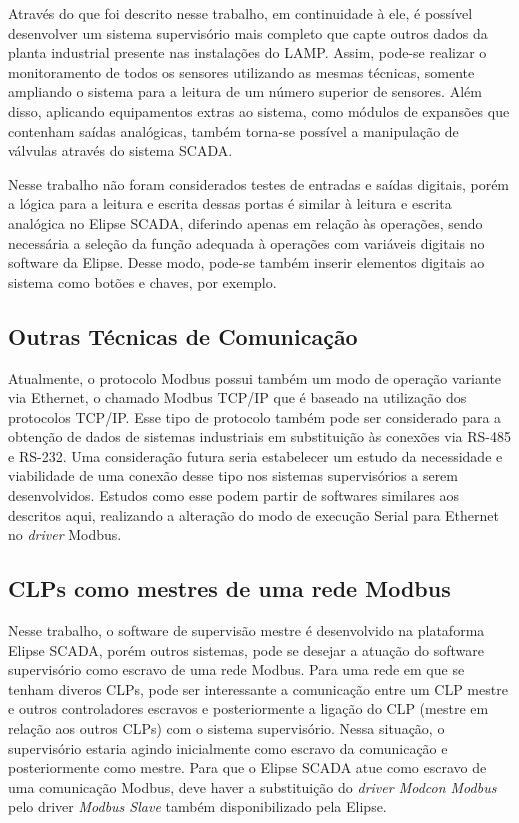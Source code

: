 Através do que foi descrito nesse trabalho, em continuidade à ele, é possível desenvolver um sistema supervisório mais completo que capte outros dados da planta industrial presente nas instalações do LAMP. Assim, pode-se realizar o monitoramento de todos os sensores utilizando as mesmas técnicas, somente ampliando o sistema para a leitura de um número superior de sensores. Além disso, aplicando equipamentos extras ao sistema, como módulos de expansões que contenham saídas analógicas, também torna-se possível a manipulação de válvulas através do sistema SCADA. 

Nesse trabalho não foram considerados testes de entradas e saídas digitais, porém a lógica para a leitura e escrita dessas portas é similar à leitura e escrita analógica no Elipse SCADA, diferindo apenas em relação às operações, sendo necessária a seleção da função adequada à operações com variáveis digitais no software da Elipse. Desse modo, pode-se também inserir elementos digitais ao sistema como botões e chaves, por exemplo.

\subsection{Outras Técnicas de Comunicação}

Atualmente, o protocolo Modbus possui também um modo de operação variante via Ethernet, o chamado Modbus TCP/IP que é baseado na utilização dos protocolos TCP/IP. Esse tipo de protocolo também pode ser considerado para a obtenção de dados de sistemas industriais em substituição às conexões via RS-485 e RS-232. Uma consideração futura seria estabelecer um estudo da necessidade e viabilidade de uma conexão desse tipo nos sistemas supervisórios a serem desenvolvidos. Estudos como esse podem partir de softwares similares aos descritos aqui, realizando a alteração do modo de execução Serial para Ethernet no \textit{driver} Modbus.

\subsection{CLPs como mestres de uma rede Modbus}

Nesse trabalho, o software de supervisão mestre é desenvolvido na plataforma Elipse SCADA, porém outros sistemas, pode se desejar a atuação do software supervisório como escravo de uma rede Modbus. Para uma rede em que se tenham diveros CLPs, pode ser interessante a comunicação entre um CLP mestre e outros controladores escravos e posteriormente a ligação do CLP (mestre em relação aos outros CLPs) com o sistema supervisório. Nessa situação, o supervisório estaria agindo inicialmente como escravo da comunicação e posteriormente como mestre. Para que o Elipse SCADA atue como escravo de uma comunicação Modbus, deve haver a substituição do \textit{driver Modcon Modbus} pelo driver \textit{Modbus Slave}\cite{elipse2016modbus} também disponibilizado pela Elipse.







